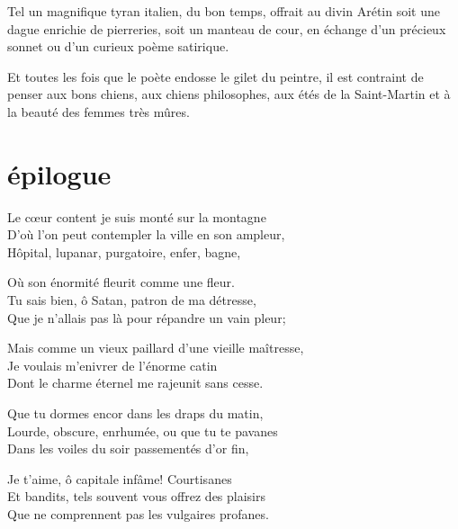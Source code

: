 Tel un magnifique tyran italien, du bon temps, offrait au divin Arétin
soit une dague enrichie de pierreries, soit un manteau de cour, en
échange d’un précieux sonnet ou d’un
curieux poème satirique.

Et toutes les fois que le poète endosse le gilet du peintre, il est
contraint de penser aux bons chiens, aux chiens philosophes, aux étés
de la Saint{}-Martin et à la beauté des femmes très mûres.

\quebra\section[Épilogue]{épilogue}

\bigskip

\noindent Le cœur content je suis monté sur la montagne\\
D'où l'on peut contempler la ville en son ampleur,\\
Hôpital, lupanar, purgatoire, enfer, bagne,\\\medskip

 \noindent Où son énormité fleurit comme une fleur.\\
Tu sais bien, ô Satan, patron de ma détresse,\\
Que je n'allais pas là pour répandre un vain pleur;\\\medskip

 \noindent Mais comme un vieux paillard d'une vieille maîtresse,\\
Je voulais m'enivrer de l'énorme catin\\
Dont le charme éternel me rajeunit sans cesse.\\\medskip

 \noindent Que tu dormes encor dans les draps du matin,\\
Lourde, obscure, enrhumée, ou que tu te pavanes\\
Dans les voiles du soir passementés d'or fin,\\\medskip

 \noindent Je t'aime, ô capitale infâme! Courtisanes\\
Et bandits, tels souvent vous offrez des plaisirs\\
Que ne comprennent pas les vulgaires profanes.\\
\vfil

\setcounter{secnumdepth}{0} %
